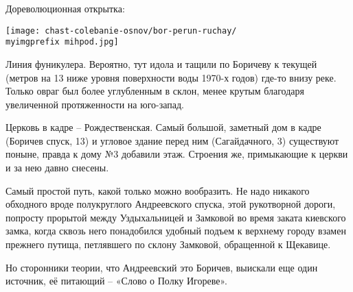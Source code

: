 


Дореволюционная открытка: 

\begin{center}
\texttt{[image: chast-colebanie-osnov/bor-perun-ruchay/\\myimgprefix mihpod.jpg]}
\end{center}

Линия фуникулера. Вероятно, тут идола и тащили по Боричеву к текущей (метров на 13 ниже уровня поверхности воды 1970-х годов) где-то внизу реке. Только овраг был более углубленным в склон, менее крутым благодаря увеличенной протяженности на юго-запад.

Церковь в кадре – Рождественская. Самый большой, заметный дом в кадре (Боричев спуск, 13) и угловое здание перед ним (Сагайдачного, 3) существуют поныне, правда к дому №3 добавили этаж. Строения же, примыкающие к церкви и за нею давно снесены.

Самый простой путь, какой только можно вообразить. Не надо никакого обходного вроде полукруглого Андреевского спуска, этой рукотворной дороги, попросту прорытой между Уздыхальницей и Замковой во время заката киевского замка, когда сквозь него понадобился удобный подъем к верхнему городу взамен прежнего путища, петлявшего по склону Замковой, обращенной к Щекавице.

Но сторонники теории, что Андреевский это Боричев, выискали еще один источник, её питающий – «Слово о Полку Игореве».
